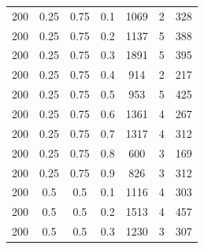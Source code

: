 \documentclass[a4paper,oneside,14pt]{extreport}
\begin{document}
\begin{table}[h]
\begin{center}
\begin{tabular}{|c|c|c|c|c|c|c|}
		200 & 0.25 & 0.75 & 0.1 & 1069 & 2 & 328 \\
		200 & 0.25 & 0.75 & 0.2 & 1137 & 5 & 388 \\
		200 & 0.25 & 0.75 & 0.3 & 1891 & 5 & 395 \\
		200 & 0.25 & 0.75 & 0.4 & 914 & 2 & 217 \\
		200 & 0.25 & 0.75 & 0.5 & 953 & 5 & 425 \\
		200 & 0.25 & 0.75 & 0.6 & 1361 & 4 & 267 \\
		200 & 0.25 & 0.75 & 0.7 & 1317 & 4 & 312 \\
		200 & 0.25 & 0.75 & 0.8 & 600 & 3 & 169 \\
		200 & 0.25 & 0.75 & 0.9 & 826 & 3 & 312 \\
		200 & 0.5 & 0.5 & 0.1 & 1116 & 4 & 303 \\
		200 & 0.5 & 0.5 & 0.2 & 1513 & 4 & 457 \\
		200 & 0.5 & 0.5 & 0.3 & 1230 & 3 & 307 \\
		\hline	
	\end{tabular}
\end{center}
\end{table}
\end{document}
